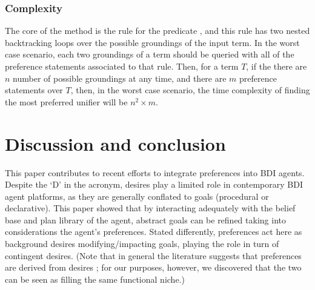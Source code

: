 \subsubsection*{Complexity}
The core of the method is the rule for the predicate , and this rule has two nested backtracking loops over the possible groundings of the input term. In the worst case scenario, each two groundings of a term should be queried with all of the preference statements associated to that rule. Then, for a term $T$, if the there are $n$ number of possible groundings at any time, and there are $m$ preference statements over $T$, then, in the worst case scenario, the time complexity of finding the most preferred unifier will be $n^2 \times m$. 




\section{Discussion and conclusion}
\label{sec:discuss}
This paper contributes to recent efforts to integrate preferences into BDI agents. Despite the `D' in the acronym, desires play a limited role in contemporary BDI agent platforms, as they are generally conflated to goals (procedural or declarative). This paper showed that by interacting adequately with the belief base and plan library of the agent, abstract goals can be refined taking into considerations the agent's preferences. Stated differently, preferences act here as background desires modifying/impacting goals, playing the role in turn of contingent desires. (Note that in general the literature suggests that preferences are
derived from desires \cite{Lorini2017}; for our purposes, however, we discovered that the two can be seen as filling the same functional niche.) 

